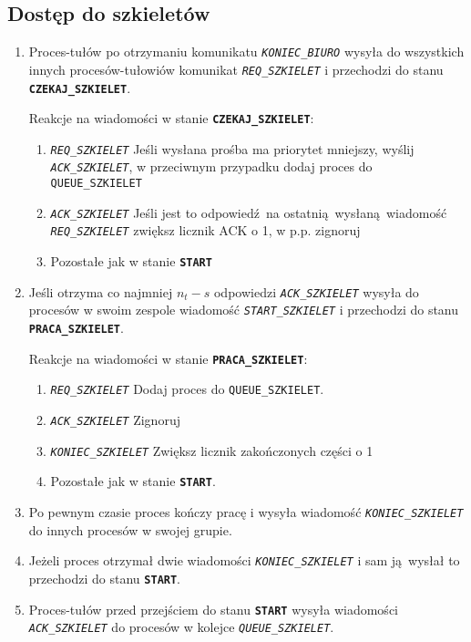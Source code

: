 \documentclass[12pt]{article}
\newcommand{\state}[1]{\texttt{\textbf{#1}}}
\newcommand{\msg}[1]{\texttt{\emph{#1}}}
\newcommand{\var}[1]{\texttt{#1}}
\begin{document}
\subsection{Dostęp do szkieletów}
\begin{enumerate}
	\item Proces-tułów po otrzymaniu komunikatu \msg{KONIEC\_BIURO} wysyła do wszystkich innych procesów-tułowiów komunikat \msg{REQ\_SZKIELET} i przechodzi do stanu \state{CZEKAJ\_SZKIELET}.
	
	Reakcje na wiadomości w stanie \state{CZEKAJ\_SZKIELET}:
	\begin{enumerate}
		\item \msg{REQ\_SZKIELET} Jeśli wysłana prośba ma priorytet mniejszy, wyślij \msg{ACK\_SZKIELET}, w przeciwnym przypadku dodaj proces do \var{QUEUE\_SZKIELET}
		\item \msg{ACK\_SZKIELET} Jeśli jest to odpowiedź na ostatnią wysłaną wiadomość \msg{REQ\_SZKIELET} zwiększ licznik ACK o 1, w p.p. zignoruj
		\item  Pozostałe jak w stanie \state{START}
	\end{enumerate}
	
	\item Jeśli otrzyma co najmniej $n_t - s$ odpowiedzi \msg{ACK\_SZKIELET} wysyła do procesów w swoim zespole wiadomość \msg{START\_SZKIELET} i przechodzi do stanu \state{PRACA\_SZKIELET}.
	
	Reakcje na wiadomości w stanie \state{PRACA\_SZKIELET}:
	\begin{enumerate}
		\item \msg{REQ\_SZKIELET} Dodaj proces do \var{QUEUE\_SZKIELET}.
		\item \msg{ACK\_SZKIELET} Zignoruj
		\item \msg{KONIEC\_SZKIELET} Zwiększ licznik zakończonych części o 1
		\item  Pozostałe jak w stanie \state{START}.
	\end{enumerate}
	
	\item Po pewnym czasie proces kończy pracę i wysyła wiadomość \msg{KONIEC\_SZKIELET} do innych procesów w swojej grupie.
	
	\item Jeżeli proces otrzymał dwie wiadomości \msg{KONIEC\_SZKIELET} i sam ją wysłał to przechodzi do stanu \state{START}.
	
	\item Proces-tułów przed przejściem do stanu \state{START} wysyła wiadomości \msg{ACK\_SZKIELET} do procesów w kolejce \msg{QUEUE\_SZKIELET}.
\end{enumerate}
\end{document}
